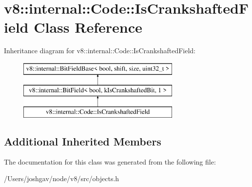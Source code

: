 \hypertarget{classv8_1_1internal_1_1_code_1_1_is_crankshafted_field}{}\section{v8\+:\+:internal\+:\+:Code\+:\+:Is\+Crankshafted\+Field Class Reference}
\label{classv8_1_1internal_1_1_code_1_1_is_crankshafted_field}
Inheritance diagram for v8\+:\+:internal\+:\+:Code\+:\+:Is\+Crankshafted\+Field\+:\begin{figure}[H]
\begin{center}
\leavevmode
\includegraphics[height=3.000000cm]{classv8_1_1internal_1_1_code_1_1_is_crankshafted_field}
\end{center}
\end{figure}
\subsection*{Additional Inherited Members}


The documentation for this class was generated from the following file\+:\begin{DoxyCompactItemize}
\item 
/\+Users/joshgav/node/v8/src/objects.\+h\end{DoxyCompactItemize}
